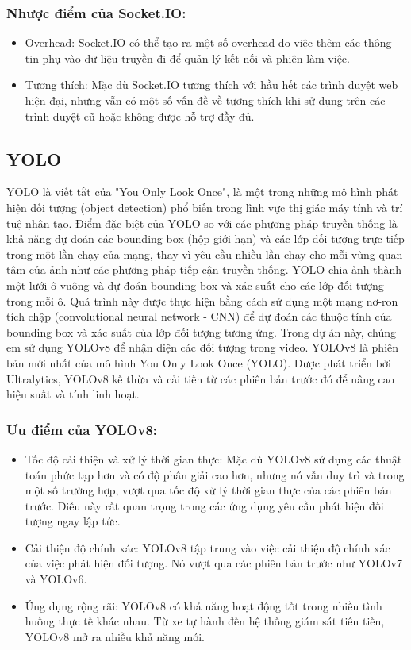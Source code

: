 \documentclass[a4paper]{article}
\begin{document}
\subsubsection{Nhược điểm của Socket.IO:}
\begin{itemize}
	\item Overhead: Socket.IO có thể tạo ra một số overhead do việc thêm các thông tin phụ vào dữ liệu truyền đi để quản lý kết nối và phiên làm việc.
    \item Tương thích: Mặc dù Socket.IO tương thích với hầu hết các trình duyệt web hiện đại, nhưng vẫn có một số vấn đề về tương thích khi sử dụng trên các trình duyệt cũ hoặc không được hỗ trợ đầy đủ.
\end{itemize}

\subsection{YOLO}
YOLO là viết tắt của "You Only Look Once", là một trong những mô hình phát hiện đối tượng (object detection) phổ biến trong lĩnh vực thị giác máy tính và trí tuệ nhân tạo. Điểm đặc biệt của YOLO so với các phương pháp truyền thống là khả năng dự đoán các bounding box (hộp giới hạn) và các lớp đối tượng trực tiếp trong một lần chạy của mạng, thay vì yêu cầu nhiều lần chạy cho mỗi vùng quan tâm của ảnh như các phương pháp tiếp cận truyền thống. YOLO chia ảnh thành một lưới ô vuông và dự đoán bounding box và xác suất cho các lớp đối tượng trong mỗi ô. Quá trình này được thực hiện bằng cách sử dụng một mạng nơ-ron tích chập (convolutional neural network - CNN) để dự đoán các thuộc tính của bounding box và xác suất của lớp đối tượng tương ứng. Trong dự án này, chúng em sử dụng YOLOv8 để nhận diện các đối tượng trong video. YOLOv8  là phiên bản mới nhất của mô hình You Only Look Once (YOLO). Được phát triển bởi Ultralytics, YOLOv8 kế thừa và cải tiến từ các phiên bản trước đó để nâng cao hiệu suất và tính linh hoạt.
\subsubsection{Ưu điểm của YOLOv8:}
\begin{itemize}
	\item Tốc độ cải thiện và xử lý thời gian thực: Mặc dù YOLOv8 sử dụng các thuật toán phức tạp hơn và có độ phân giải cao hơn, nhưng nó vẫn duy trì và trong một số trường hợp, vượt qua tốc độ xử lý thời gian thực của các phiên bản trước. Điều này rất quan trọng trong các ứng dụng yêu cầu phát hiện đối tượng ngay lập tức.
    \item Cải thiện độ chính xác: YOLOv8 tập trung vào việc cải thiện độ chính xác của việc phát hiện đối tượng. Nó vượt qua các phiên bản trước như YOLOv7 và YOLOv6.
    \item Ứng dụng rộng rãi: YOLOv8 có khả năng hoạt động tốt trong nhiều tình huống thực tế khác nhau. Từ xe tự hành đến hệ thống giám sát tiên tiến, YOLOv8 mở ra nhiều khả năng mới.
\end{itemize}
\end{document}
